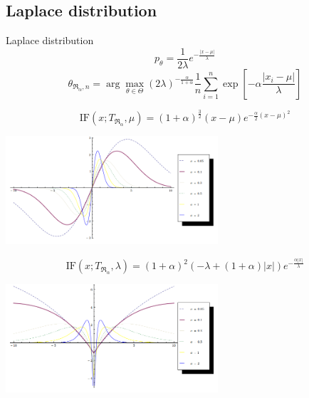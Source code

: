\documentclass[11pt,a4paper]{beamer}
\newcommand{\amtiT}{\arg \max_{\theta \in \Theta}}
\begin{document}
\subsection{Laplace distribution}    %
\begin{frame}{Laplace distribution}
	\begin{equation*}
		p_\theta = \frac{1}{2\lambda} e^{-\frac{|x-\mu|}{\lambda}}
	\end{equation*}
	\begin{equation*}
		\theta_{\mathfrak{R}_\alpha,n} = \amtiT (2\lambda)^{-\frac{\alpha}{1+\alpha}} \frac{1}{n} \sum_{i=1}^n \exp \left[-\alpha\frac{|x_i-\mu|}{\lambda} \right]
	\end{equation*}
\end{frame}

\begin{frame}
	\begin{equation*}
		\mathrm{IF}(x;T_{\mathfrak{R}_\alpha},\mu) = (1+\alpha )^{\frac{3}{2}} (x-\mu )  e^{-\frac{\alpha}{2} (x-\mu )^2}%
	\end{equation*}

	\begin{center}
		\includegraphics[width = 3.1in]{IF-Laplace-mu.png}			
	\end{center}
\end{frame}

\begin{frame}
	\begin{equation*}
		\mathrm{IF}(x;T_{\mathfrak{R}_\alpha},\lambda) = (1 + \alpha)^2 \left(-\lambda + (1 + \alpha)|x|\right)  e^{-\frac{\alpha|x|}{\lambda}}	 %
	\end{equation*}
	\begin{center}
		\includegraphics[width = 3.1in]{IF-Laplace-sigma.png}			
	\end{center}
\end{frame}
\end{document}

